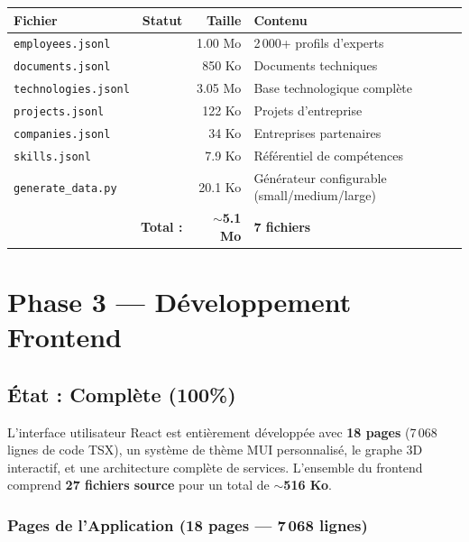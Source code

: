 \documentclass[12pt,a4paper]{article}
\newcommand{\cmark}{\textcolor{vert}{\ding{51}}}
\begin{document}
\begin{center}
\renewcommand{\arraystretch}{1.3}
\begin{tabular}{|l|c|r|l|}
\hline
\rowcolor{bleu!15}
\textbf{Fichier} & \textbf{Statut} & \textbf{Taille} & \textbf{Contenu} \\
\hline
\texttt{employees.jsonl} & \cmark & 1.00 Mo & 2\,000+ profils d'experts \\
\hline
\texttt{documents.jsonl} & \cmark & 850 Ko & Documents techniques \\
\hline
\texttt{technologies.jsonl} & \cmark & 3.05 Mo & Base technologique complète \\
\hline
\texttt{projects.jsonl} & \cmark & 122 Ko & Projets d'entreprise \\
\hline
\texttt{companies.jsonl} & \cmark & 34 Ko & Entreprises partenaires \\
\hline
\texttt{skills.jsonl} & \cmark & 7.9 Ko & Référentiel de compétences \\
\hline
\texttt{generate\_data.py} & \cmark & 20.1 Ko & Générateur configurable (small/medium/large) \\
\hline
\multicolumn{2}{|r|}{\textbf{Total :}} & \textbf{$\sim$5.1 Mo} & \textbf{7 fichiers} \\
\hline
\end{tabular}
\end{center}

\section{Phase 3 — Développement Frontend}

\subsection{État : \textcolor{vert}{Complète (100\%)}}

L'interface utilisateur React est entièrement développée avec \textbf{18 pages} (7\,068 lignes de code TSX), un système de thème MUI personnalisé, le graphe 3D interactif, et une architecture complète de services. L'ensemble du frontend comprend \textbf{27 fichiers source} pour un total de \textbf{$\sim$516 Ko}.

\subsubsection{Pages de l'Application (18 pages — 7\,068 lignes)}
\end{document}
